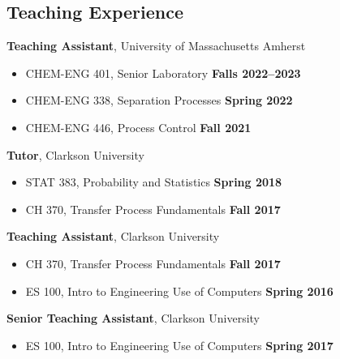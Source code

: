 \documentclass[margin,line]{res}
\begin{document}
\begin{resume}
	\vspace{-1em}

	\section{\sc Teaching Experience}
	 {\bf Teaching Assistant}, University of Massachusetts Amherst
	\vspace*{.05in}
	\begin{itemize}
		\item[ ] CHEM-ENG 401, Senior Laboratory \hfill {\bf Falls 2022--2023}
		\item[ ] CHEM-ENG 338, Separation Processes \hfill {\bf Spring 2022}
		\item[ ] CHEM-ENG 446, Process Control \hfill {\bf Fall 2021}
	\end{itemize}
	{\bf Tutor}, Clarkson University
	\vspace*{.05in}
	\begin{itemize}
		\item[ ] STAT 383, Probability and Statistics \hfill {\bf Spring 2018}
		\item[ ] CH 370, Transfer Process Fundamentals \hfill {\bf Fall 2017}
	\end{itemize}
	{\bf Teaching Assistant}, Clarkson University
	\vspace*{.05in}
	\begin{itemize}
		\item[ ] CH 370, Transfer Process Fundamentals \hfill {\bf Fall 2017}
		\item[ ] ES 100, Intro to Engineering Use of Computers \hfill {\bf Spring 2016}
	\end{itemize}
	{\bf Senior Teaching Assistant}, Clarkson University
	\vspace*{.05in}
	\begin{itemize}
		\item[ ] ES 100, Intro to Engineering Use of Computers \hfill {\bf Spring 2017}
	\end{itemize}


\end{resume}
\end{document}
